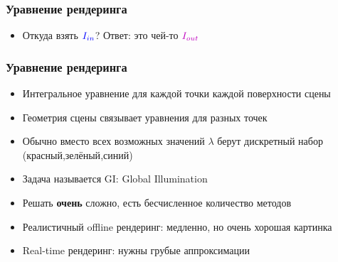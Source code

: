 \documentclass{beamer}
\begin{document}
\begin{frame}[fragile]
\frametitle{Уравнение рендеринга}
\begin{itemize}
\item Откуда взять \begin{math}{\color{blue}I_{in}}\end{math}? \pause Ответ: это чей-то \begin{math}{\color{magenta}I_{out}}\end{math} 
\end{itemize}
\begin{center}
\end{center}
\end{frame}

\begin{frame}[fragile]
\frametitle{Уравнение рендеринга}
\begin{itemize}
\item Интегральное уравнение для каждой точки каждой поверхности сцены
\pause
\item Геометрия сцены связывает уравнения для разных точек
\pause
\item Обычно вместо всех возможных значений \begin{math}\lambda\end{math} берут дискретный набор ({\color{red}красный},{\color{green}зелёный},{\color{blue}синий})
\pause
\item Задача называется GI: Global Illumination
\pause
\item Решать \textbf{очень} сложно, есть бесчисленное количество методов
\pause
\item Реалистичный offline рендеринг: медленно, но очень хорошая картинка
\pause
\item Real-time рендеринг: нужны грубые аппроксимации
\end{itemize}
\end{frame}
\end{document}
